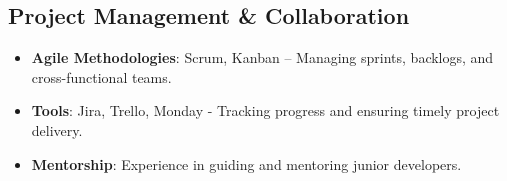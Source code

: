 
\begin{cventries}

\begin{row}[cellsep=0.75cm]{1}{1}
    \begin{cell}{1}
	\section*{Project Management \& Collaboration}
	\vspace{-1.5ex}
    \begin{itemize} 
        \item {\textbf{Agile Methodologies}: Scrum, Kanban – Managing sprints, backlogs, and cross-functional teams.}
        \item {\textbf{Tools}: Jira, Trello, Monday - Tracking progress and ensuring timely project delivery.}
        \item {\textbf{Mentorship}: Experience in guiding and mentoring junior developers.}
    \end{itemize}
	\end{cell}
\end{row}

\begin{row}[cellsep=0.75cm]{1}{1}
    \begin{cell}{1}

\end{cell}
\end{row}
\end{cventries}
